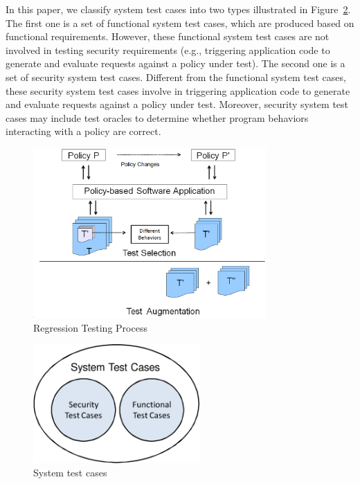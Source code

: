 In this paper, we classify system test cases into two types illustrated in Figure~\ref{fig:systemtestcases}.
The first one is a set of functional system test cases, which
are produced based on functional requirements. However, these functional
system test cases are not involved in testing security requirements (e.g., triggering application code to generate
and evaluate requests against a policy under test).
The second one is a set of security system test cases.
Different from the functional system test cases,
these security system test cases
involve in triggering application code to generate
and evaluate requests against a policy under test.
Moreover, security system test cases may include test oracles
to determine whether program behaviors interacting with a policy
are correct.


%
%
\begin{figure}[t]
    \centering
        \includegraphics[width=3.5in]{regressiontesting.eps}
       \vspace{-4pt}
    \caption{\label{fig:process}Regression Testing Process}
   \vspace{-10pt}
\end{figure}
\begin{figure}[t]
    \centering
    \vspace{+5pt}
        \includegraphics[width=2.5in]{systemtestcases.eps}
       \vspace{-4pt}
    \caption{\label{fig:systemtestcases}System test cases}
   \vspace{-10pt}
    \vspace{+3pt}
\end{figure}

